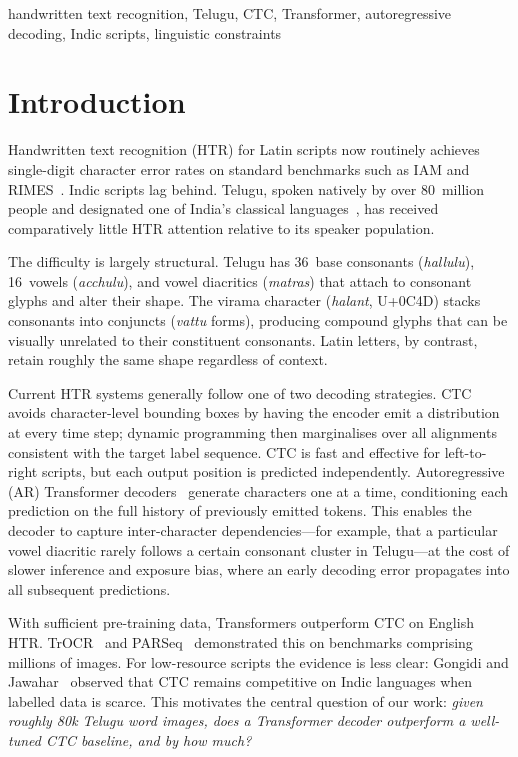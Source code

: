 \documentclass[conference]{IEEEtran}
\begin{document}
\begin{IEEEkeywords}
handwritten text recognition, Telugu, CTC, Transformer, autoregressive decoding, Indic scripts, linguistic constraints
\end{IEEEkeywords}

\section{Introduction}

Handwritten text recognition (HTR) for Latin scripts now routinely achieves single-digit character error rates on standard benchmarks such as IAM and RIMES~\cite{vaswani2017attention, li2023trocr}. Indic scripts lag behind. Telugu, spoken natively by over 80~million people and designated one of India's classical languages~\cite{ethnologue2024}, has received comparatively little HTR attention relative to its speaker population.

The difficulty is largely structural. Telugu has 36~base consonants (\textit{hallulu}), 16~vowels (\textit{acchulu}), and vowel diacritics (\textit{matras}) that attach to consonant glyphs and alter their shape. The virama character (\textit{halant}, U+0C4D) stacks consonants into conjuncts (\textit{vattu} forms), producing compound glyphs that can be visually unrelated to their constituent consonants. Latin letters, by contrast, retain roughly the same shape regardless of context.

Current HTR systems generally follow one of two decoding strategies. CTC~\cite{graves2006ctc} avoids character-level bounding boxes by having the encoder emit a distribution at every time step; dynamic programming then marginalises over all alignments consistent with the target label sequence. CTC is fast and effective for left-to-right scripts, but each output position is predicted independently. Autoregressive (AR) Transformer decoders~\cite{vaswani2017attention} generate characters one at a time, conditioning each prediction on the full history of previously emitted tokens. This enables the decoder to capture inter-character dependencies---for example, that a particular vowel diacritic rarely follows a certain consonant cluster in Telugu---at the cost of slower inference and exposure bias, where an early decoding error propagates into all subsequent predictions.

With sufficient pre-training data, Transformers outperform CTC on English HTR. TrOCR~\cite{li2023trocr} and PARSeq~\cite{bautista2022parseq} demonstrated this on benchmarks comprising millions of images. For low-resource scripts the evidence is less clear: Gongidi and Jawahar~\cite{gongidi2021iiit} observed that CTC remains competitive on Indic languages when labelled data is scarce. This motivates the central question of our work: \textit{given roughly 80k Telugu word images, does a Transformer decoder outperform a well-tuned CTC baseline, and by how much?}
\end{document}
